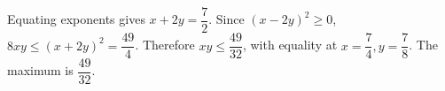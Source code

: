 Equating exponents gives $x+2y=\dfrac{7}{2}$. Since $(x-2y)^2\ge0$, $8xy\le(x+2y)^2=\dfrac{49}{4}$. Therefore $xy\le\dfrac{49}{32}$, with equality at $x=\dfrac{7}{4},y=\dfrac{7}{8}$. The maximum is $\boxed{\dfrac{49}{32}}$.

